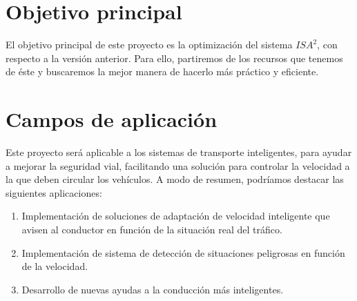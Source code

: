 



\section{Objetivo principal}


El objetivo principal de este proyecto es la optimización del sistema $ISA^{2}$, con respecto a la versión anterior. Para ello, partiremos de los recursos que tenemos de éste y buscaremos la mejor manera de hacerlo más práctico y eficiente.



\section{Campos de aplicación}


Este proyecto será aplicable a los sistemas de transporte inteligentes, para ayudar a mejorar la seguridad vial, facilitando una solución para controlar la velocidad a la que deben circular los vehículos. A modo de resumen, podríamos destacar las siguientes aplicaciones:
\begin{enumerate}	
	\item Implementación de soluciones de adaptación de velocidad inteligente que avisen al conductor en función de la situación real del tráfico.
	\item Implementación de sistema de detección de situaciones peligrosas en función de la velocidad.
	\item Desarrollo de nuevas ayudas a la conducción más inteligentes.
\end{enumerate}


